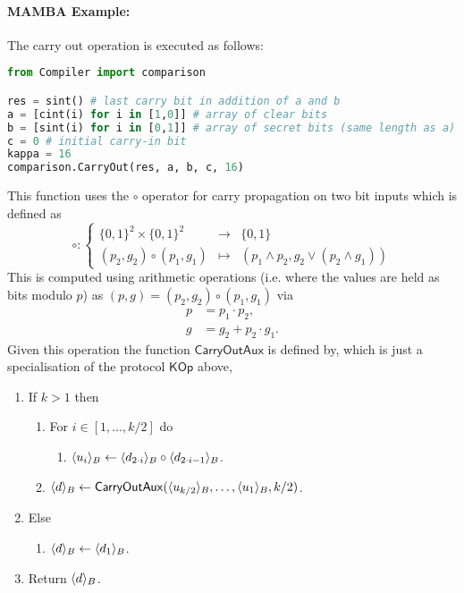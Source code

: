 \paragraph{MAMBA Example:}  The carry out operation is executed as follows: 
\begin{lstlisting}[language={python}]
from Compiler import comparison

res = sint() # last carry bit in addition of a and b
a = [cint(i) for i in [1,0]] # array of clear bits
b = [sint(i) for i in [0,1]] # array of secret bits (same length as a)
c = 0 # initial carry-in bit
kappa = 16
comparison.CarryOut(res, a, b, c, 16)
\end{lstlisting}
This function uses the $\circ$ operator for carry propagation on two
bit inputs which is defined as
\[  \circ:  \left\{ \begin{array}{ccc}
			\{0,1\}^2 \times \{0,1\}^2 & \longrightarrow & \{0,1\} \\
			(p_2,g_2) \circ (p_1,g_1) & \longmapsto &
			 (p_1 \wedge p_2, g_2 \vee (p_2 \wedge g_1))
		     \end{array} \right.
\]
This is computed using arithmetic operations (i.e. where the values are
held as bits modulo $p$) as $(p,g) = (p_2,g_2) \circ (p_1,g_1)$ via
\begin{align*}
	p &= p_1 \cdot p_2, \\
	g &= g_2 + p_2 \cdot g_1.
\end{align*}
Given this operation the function $\mathsf{CarryOutAux}$ is defined by,
which is just a specialisation of the protocol $\mathsf{KOp}$ above,
\begin{enumerate}
\item If $k>1$ then
\begin{enumerate}
  \item For $i \in [1,\ldots,k/2]$ do
  \begin{enumerate}
     \item $\langle u_i \rangle_B \leftarrow \langle d_{2\cdot i} \rangle_B \circ \langle d_{2 \cdot i-1} \rangle_B$.
  \end{enumerate}
  \item $\langle d \rangle_B \leftarrow \mathsf{CarryOutAux}(\langle u_{k/2} \rangle_B,\ldots,\langle u_1 \rangle_B,k/2)$.
\end{enumerate}
\item Else
\begin{enumerate}
   \item $\langle d \rangle_B \leftarrow \langle d_1 \rangle_B$.
\end{enumerate}
\item Return $\langle d \rangle_B$.
\end{enumerate}

